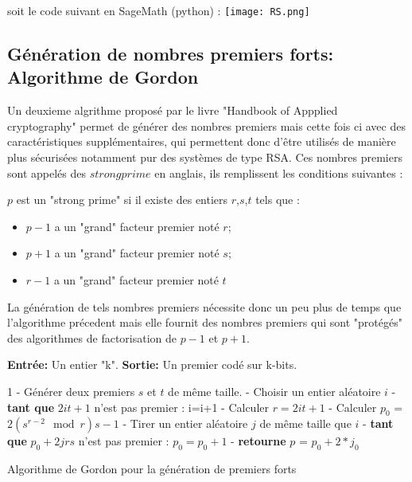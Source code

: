 \documentclass[a4paper,11pt]{article}
\renewcommand{\algorithmicreturn}{\textbf{retourne}}
\renewcommand{\algorithmicrequire}{\textbf{Entrée:}}
\renewcommand{\algorithmicensure}{\textbf{Sortie:}}
\renewcommand{\algorithmicwhile}{\textbf{tant que}}
\begin{document}
soit le code suivant en SageMath (python) :
\newline
\texttt{[image: RS.png]}

\subsection{Génération de nombres premiers forts: Algorithme de Gordon}

Un deuxieme algrithme proposé par le livre "Handbook of Appplied cryptography" permet de générer des nombres premiers mais cette fois ci avec des caractéristiques supplémentaires, qui permettent donc d'être utilisés de manière plus sécurisées notamment pur des systèmes de type RSA.
Ces nombres premiers sont appelés des $strong prime$ en anglais, ils remplissent les conditions suivantes : \newline

$p$ est un "strong prime" si il existe des entiers $r$,$s$,$t$ tels que :
\begin{itemize}
\item $p-1$ a un "grand" facteur premier noté $r$;
\item $p+1$ a un "grand" facteur premier noté $s$;
\item $r-1$ a un "grand" facteur premier noté $t$
\end{itemize}
\newline
\medbreak

    La génération de tels nombres premiers nécessite donc un peu plus de temps que l'algorithme précedent mais elle fournit des nombres premiers qui sont "protégés" des algorithmes de factorisation de $p-1$ et $p+1$.
    
    

\begin{algorithm}[H]
\SetAlgoLined


\algorithmicrequire{ Un entier "k".}\newline
\algorithmicensure{ Un premier codé sur k-bits.}\newline

 1 - Générer deux premiers $s$ et $t$ de même taille. - Choisir un entier aléatoire $i$  - \algorithmicwhile{ $2it+1$ n'est pas premier : }\newline
\hspace*{15mm} i=i+1 - Calculer $r = 2it+1$  - Calculer $ p_{0}$ = $ 2 ( s^{r-2} \mod r )s - 1$  - Tirer un entier aléatoire $j$ de même taille que $i$  - \algorithmicwhile{ $p_{0} + 2jrs $ n'est pas premier : }\newline
 \hspace*{15mm} $p_{0}=p_{0}+1$ - \algorithmicreturn{ $p$ = $p_{0} + 2 * j_{0}$}
 
 
 
 \caption{Algorithme de Gordon pour la génération de premiers forts}
\end{algorithm}
\end{document}

